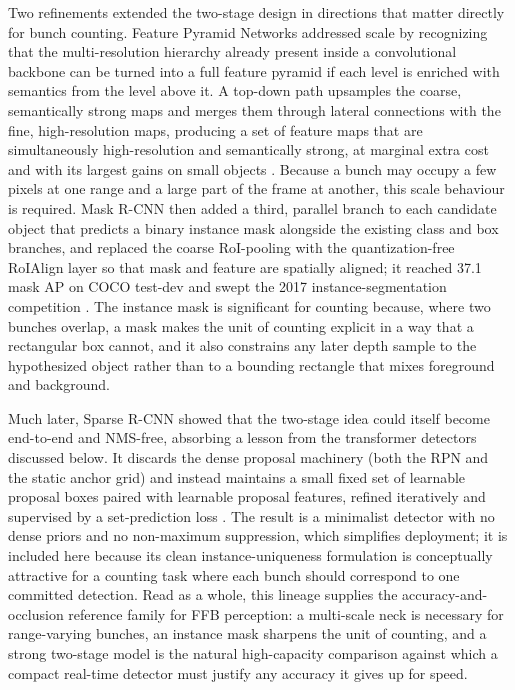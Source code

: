 Two refinements extended the two-stage design in directions that matter directly for bunch counting. Feature Pyramid Networks addressed scale by recognizing that the multi-resolution hierarchy already present inside a convolutional backbone can be turned into a full feature pyramid if each level is enriched with semantics from the level above it. A top-down path upsamples the coarse, semantically strong maps and merges them through lateral connections with the fine, high-resolution maps, producing a set of feature maps that are simultaneously high-resolution and semantically strong, at marginal extra cost and with its largest gains on small objects \cite{lin2017fpn}. Because a bunch may occupy a few pixels at one range and a large part of the frame at another, this scale behaviour is required. Mask R-CNN then added a third, parallel branch to each candidate object that predicts a binary instance mask alongside the existing class and box branches, and replaced the coarse RoI-pooling with the quantization-free RoIAlign layer so that mask and feature are spatially aligned; it reached 37.1 mask AP on COCO test-dev and swept the 2017 instance-segmentation competition \cite{he2017maskrcnn}. The instance mask is significant for counting because, where two bunches overlap, a mask makes the unit of counting explicit in a way that a rectangular box cannot, and it also constrains any later depth sample to the hypothesized object rather than to a bounding rectangle that mixes foreground and background.

Much later, Sparse R-CNN showed that the two-stage idea could itself become end-to-end and NMS-free, absorbing a lesson from the transformer detectors discussed below. It discards the dense proposal machinery (both the RPN and the static anchor grid) and instead maintains a small fixed set of learnable proposal boxes paired with learnable proposal features, refined iteratively and supervised by a set-prediction loss \cite{sun2021sparsercnn}. The result is a minimalist detector with no dense priors and no non-maximum suppression, which simplifies deployment; it is included here because its clean instance-uniqueness formulation is conceptually attractive for a counting task where each bunch should correspond to one committed detection. Read as a whole, this lineage supplies the accuracy-and-occlusion reference family for FFB perception: a multi-scale neck is necessary for range-varying bunches, an instance mask sharpens the unit of counting, and a strong two-stage model is the natural high-capacity comparison against which a compact real-time detector must justify any accuracy it gives up for speed.

